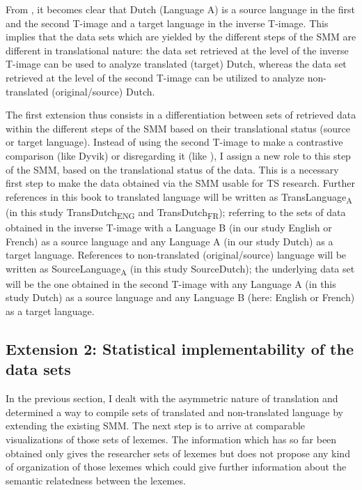 From , it becomes clear that Dutch (Language A) is a source language in the first and the second T-image and a target language in the inverse T-image. This implies that the data sets which are yielded by the different steps of the SMM are different in translational nature: the data set retrieved at the level of the inverse T-image can be used to analyze translated (target) Dutch, whereas the data set retrieved at the level of the second T-image can be utilized to analyze non-translated (original\slash source) Dutch.

The first extension thus consists in a differentiation between sets of retrieved data within the different steps of the SMM based on their translational status (source or target language). Instead of using the second T-image to make a contrastive comparison (like Dyvik) or disregarding it (like \citealt{aijmer_model_2004}), I assign a new role to this step of the SMM, based on the translational status of the data. This is a necessary first step to make the data obtained via the SMM usable for TS research. Further references in this book to translated language will be written as TransLanguage\textsubscript{A} (in this study TransDutch\textsubscript{ENG} and TransDutch\textsubscript{FR}); referring to the sets of data obtained in the inverse T-image with a Language B (in our study English or French) as a source language and any Language A (in our study Dutch) as a target language. References to non-translated (original\slash source) language will be written as SourceLanguage\textsubscript{A} (in this study SourceDutch); the underlying data set will be the one obtained in the second T-image with any Language A (in this study Dutch) as a source language and any Language B (here: English or French) as a target language.

\subsection{Extension 2: Statistical implementability of the data sets}
\label{sec:3.5.2}
In the previous section, I dealt with the asymmetric nature of translation and determined a way to compile sets of translated and non-translated language by extending the existing SMM. The next step is to arrive at comparable visualizations of those sets of lexemes. The information which has so far been obtained only gives the researcher sets of lexemes but does not propose any kind of organization of those lexemes which could give further information about the semantic relatedness between the lexemes.

